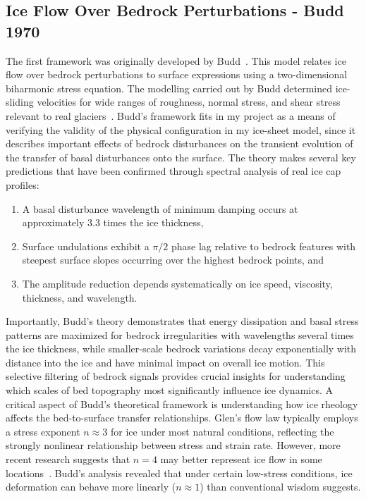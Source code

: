 \subsection{Ice Flow Over Bedrock Perturbations - Budd 1970}
The first framework was originally developed by Budd~\cite{Budd_1970}. This model relates ice flow over bedrock perturbations to surface expressions using a two-dimensional biharmonic stress equation. The modelling carried out by Budd determined ice-sliding velocities for wide ranges of roughness, normal stress, and shear stress relevant to real glaciers~\cite{Budd_1970}. Budd's framework fits in my project as a means of verifying the validity of the physical configuration in my ice-sheet model, since it describes important effects of bedrock disturbances on the transient evolution of the transfer of basal disturbances onto the surface. The theory makes several key predictions that have been confirmed through spectral analysis of real ice cap profiles: 
\begin{enumerate}
    \item A basal disturbance wavelength of minimum damping occurs at approximately 3.3 times the ice thickness, 
    \item Surface undulations exhibit a $\pi/2$ phase lag relative to bedrock features with steepest surface slopes occurring over the highest bedrock points, and 
    \item The amplitude reduction depends systematically on ice speed, viscosity, thickness, and wavelength. 
\end{enumerate}
Importantly, Budd's theory demonstrates that energy dissipation and basal stress patterns are maximized for bedrock irregularities with wavelengths several times the ice thickness, while smaller-scale bedrock variations decay exponentially with distance into the ice and have minimal impact on overall ice motion. This selective filtering of bedrock signals provides crucial insights for understanding which scales of bed topography most significantly influence ice dynamics.
A critical aspect of Budd's theoretical framework is understanding how ice rheology affects the bed-to-surface transfer relationships. Glen's flow law typically employs a stress exponent $n\approx 3$ for ice under most natural conditions, reflecting the strongly nonlinear relationship between stress and strain rate. However, more recent research suggests that $n = 4$ may better
represent ice flow in some locations~\cite{Getraer_2025}.  Budd's analysis revealed that under certain low-stress conditions, ice deformation can behave more linearly ($n\approx 1$) than conventional wisdom suggests. 

